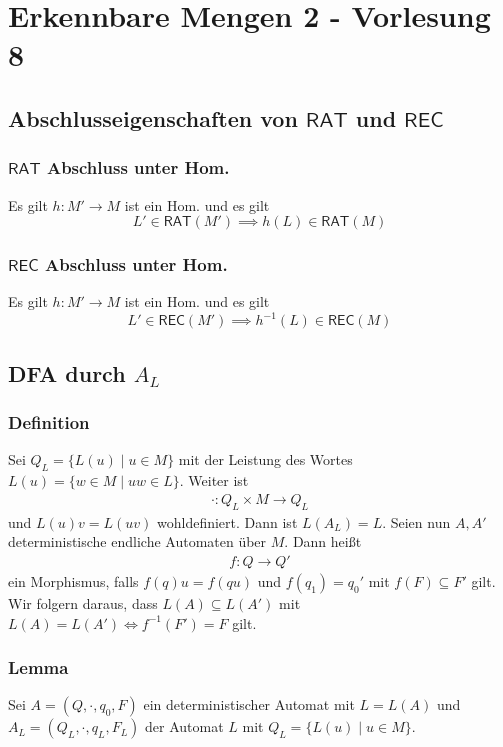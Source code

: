 \documentclass[12pt, german]{article}
\newcommand{\inv}{^{-1}}
\newcommand{\rat}{\mathsf{RAT}}
\newcommand{\rec}{\mathsf{REC}}
\begin{document}
	\section{Erkennbare Mengen 2 - Vorlesung 8}
	\subsection{Abschlusseigenschaften von $\rat$ und $\rec$}
	\subsubsection{$\rat$ Abschluss unter Hom.}
	Es gilt $h: M' \to M$ ist ein Hom. und es gilt $$L' \in \rat(M') \implies h(L) \in \rat(M)$$
	
	\subsubsection{$\rec$ Abschluss unter Hom.}
	Es gilt $h: M' \to M$ ist ein Hom. und es gilt $$L' \in \rec(M') \implies h\inv(L) \in \rec(M)$$
	
	\subsection{DFA durch $A_L$}
	\subsubsection{Definition}
	Sei $Q_L = \{L(u) \mid u \in M\}$ mit der Leistung des Wortes $L(u) = \{ w \in M \mid uw \in L\}$. Weiter ist 
	\begin{align*}
		\cdot: Q_L \times M  \to Q_L
	\end{align*}
	und $L(u)v = L(uv)$ wohldefiniert. Dann ist $L(A_L) = L$. 
	Seien nun $A, A'$ deterministische endliche Automaten über $M$. Dann heißt 
	\begin{align*}
		f: Q \to Q'
	\end{align*} ein Morphismus, falls $f(q)u=f(qu)$ und $f(q_1) = q_0'$ mit $f(F) \subseteq F'$ gilt.
	Wir folgern daraus, dass $L(A) \subseteq L(A')$ mit $L(A) = L(A') \iff f\inv(F') = F$ gilt. 
	
	\subsubsection{Lemma}
	Sei $A = (Q, \cdot, q_0, F)$ ein deterministischer Automat mit $L = L(A)$ und $A_L = (Q_L, \cdot, q_L, F_L)$ der Automat $L$ mit $Q_L = \{L(u) \mid u \in M\}$.  \\
	
\end{document}
